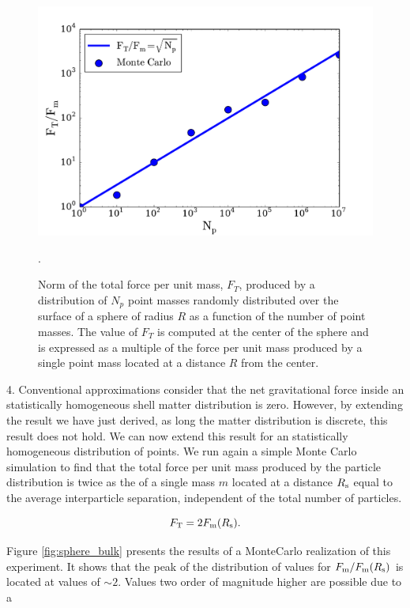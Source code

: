 \documentclass{article}
\begin{document}
\begin{figure}
\begin{center}
\includegraphics[width=0.8\linewidth,angle=0]{spheres_surface.pdf}
\caption{Norm of the total force per unit mass, $F_{T}$, produced by a distribution of
  $N_p$ point masses randomly distributed over the surface of a sphere
  of radius $R$ as a function of the number of point masses. The value
  of $F_T$ is  computed at the center of the sphere and is  expressed
  as a multiple  of the force per unit mass produced by a  single
  point mass located  at a distance $R$ from the
  center. \label{fig:sphere_surface}}. 
\end{center}
\end{figure}


4. Conventional approximations consider that the net gravitational force
inside an statistically homogeneous shell matter distribution is
zero. However, by extending the result we have just derived, as long
the matter distribution is discrete, this result does not hold. We can
now extend this result for an statistically homogeneous distribution
of points. We run again a simple Monte Carlo simulation to find
that the total force per unit mass produced by the particle distribution is twice as
the of a single mass $m$ located at a distance $R_{\rm s}$ equal to
the average interparticle separation, independent of the total number of
particles. 

\begin{equation}
F_{\rm T} = 2 F_{\rm m}(R_{\rm s}).
\end{equation}

Figure \ref{fig:sphere_bulk} presents the results of a MonteCarlo
realization of this experiment. It shows that the peak of the
distribution of values for $F_{\rm m}/F_{\rm m}(R_{\rm s})$ is
located at values of $\sim 2$. Values two order of magnitude higher
are possible due to a 
\end{document}
